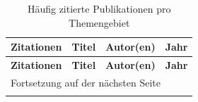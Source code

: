 \tiny
\centering
\begin{longtable}{|c|p{6cm}|p{3cm}|c|}
    \caption{Häufig zitierte Publikationen pro Themengebiet\label{tab:zitationen}} \\
    \hline
    \textbf{Zitationen} & \textbf{Titel} & \textbf{Autor(en)} & \textbf{Jahr} \\
    \hline
    \endfirsthead

    \hline
    \textbf{Zitationen} & \textbf{Titel} & \textbf{Autor(en)} & \textbf{Jahr} \\
    \hline
    \endhead

    \hline
    \multicolumn{4}{l}{Fortsetzung auf der nächsten Seite} \\
    \hline
    \endfoot

    \hline
    \endlastfoot


\end{longtable}

